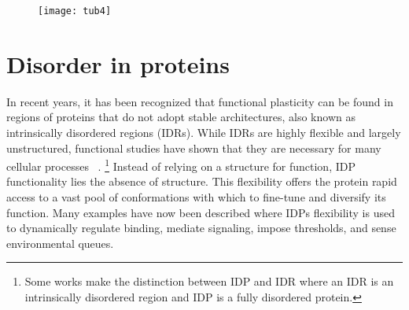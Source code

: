 \begin{figure}[h!]
\centering
\texttt{[image: tub4]}
\label{fig:tub4}
\end{figure}

\section{Disorder in proteins}

In recent years, it has been recognized that functional plasticity  can be found in regions of proteins that  do not adopt stable architectures, also known as intrinsically disordered regions (IDRs). While IDRs are highly flexible and largely unstructured, functional studies have shown that they are necessary for many cellular processes ~\cite{wright2015intrinsically}.  \footnote{Some works make the distinction between IDP and IDR where an IDR is an intrinsically disordered region and IDP is a fully disordered protein.} Instead of relying on a structure for function, IDP functionality lies the absence of structure. This flexibility offers the protein rapid access to a vast pool of conformations with which to fine-tune and diversify its function. Many examples have now been described where IDPs flexibility is used to dynamically regulate binding, mediate signaling, impose thresholds, and sense environmental queues. 

